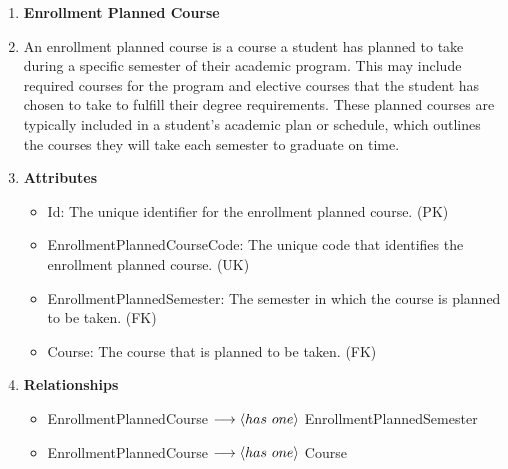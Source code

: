 \documentclass[12pt]{article}
\begin{document}
\begin{appendices}
\begin{enumerate}[label=(\roman*)]
    \item \textbf{Enrollment Planned Course}
    \item[] An enrollment planned course is a course a student has planned to take during a specific semester of their academic program. This may include required courses for the program and elective courses that the student has chosen to take to fulfill their degree requirements. These planned courses are typically included in a student's academic plan or schedule, which outlines the courses they will take each semester to graduate on time.
    \item[] \textbf{Attributes}
    \begin{itemize}
        \item Id: The unique identifier for the enrollment planned course. (PK)
        \item EnrollmentPlannedCourseCode: The unique code that identifies the enrollment planned course. (UK)
        \item EnrollmentPlannedSemester: The semester in which the course is planned to be taken. (FK)
        \item Course: The course that is planned to be taken. (FK)
    \end{itemize}
    \item[] \textbf{Relationships}
    \begin{itemize}
        \item EnrollmentPlannedCourse $ \longrightarrow \langle has \hspace{0.125cm} one \rangle $ EnrollmentPlannedSemester
        \item EnrollmentPlannedCourse $ \longrightarrow \langle has \hspace{0.125cm} one \rangle $ Course
    \end{itemize}


\end{enumerate}
\end{appendices}
\end{document}
